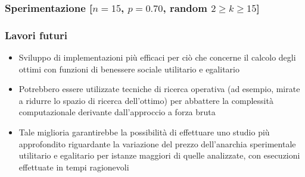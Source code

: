 \documentclass{beamer}
\begin{document}
\begin{frame}
\frametitle{Sperimentazione [$n=15$, $p=0.70$, random $2 \geq k \geq 15$]}
\end{frame}


\begin{frame}
\frametitle{Lavori futuri}
\begin{itemize}
	\item Sviluppo di implementazioni più efficaci per ciò che concerne il calcolo degli ottimi con funzioni di benessere sociale utilitario e egalitario
	\item Potrebbero essere utilizzate tecniche di ricerca operativa (ad esempio, mirate a ridurre lo spazio di ricerca dell'ottimo) per abbattere la complessità computazionale derivante dall'approccio a forza bruta
	\item Tale miglioria garantirebbe la possibilità di effettuare uno studio più approfondito riguardante la variazione del prezzo dell'anarchia sperimentale utilitario e egalitario per istanze maggiori di quelle analizzate, con esecuzioni effettuate in tempi ragionevoli
\end{itemize}
\end{frame}
\end{document}
